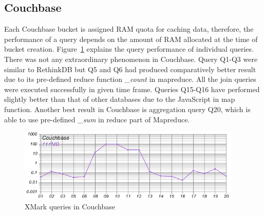 \subsection{Couchbase}
Each Couchbase bucket is assigned RAM quota for caching data, therefore, the performance of a query depends on the amount of RAM allocated at the time of bucket creation. Figure~\ref{fig:xmark-result-cb-all} explains the query performance of individual queries. There was not any extraordinary phenomenon in Couchbase.  Query Q1-Q3  were similar to RethinkDB but Q5 and Q6 had produced comparatively better result due to its pre-defined reduce function \textit{\_count} in mapreduce. All the join queries were executed successfully in given time frame. Queries Q15-Q16 have performed slightly  better than that of other databases due to the JavaScript in map function. Another best result in Couchbase is aggregation query Q20, which is able to use pre-defined \textit{\_sum} in reduce part of Mapreduce. 

\begin{figure}
	\centering
	\includegraphics[width=0.95\textwidth]{img/result/cb/cb-all}
	\caption{XMark queries in Couchbase}
	\label{fig:xmark-result-cb-all}
\end{figure}

